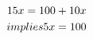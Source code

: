 \documentclass[preview]{standalone}
\begin{document}
\begin{align*}
\special{dvisvgm:raw <g id='unique000'>}15x = 100 + 10x \\implies 5x = 100\special{dvisvgm:raw </g>}
\end{align*}
\end{document}
